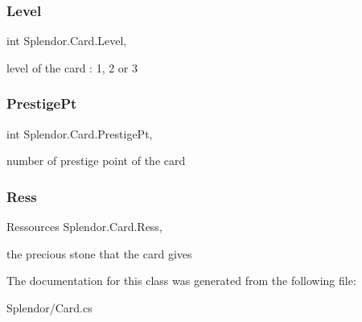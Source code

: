 \mbox{\label{class_splendor_1_1_card_aadc9953aeb322c82e04fbd9b5a3b996d}} 
\subsubsection{\texorpdfstring{Level}{Level}}
{\footnotesize\ttfamily int Splendor.\+Card.\+Level\hspace{0.3cm}{\ttfamily [get]}, {\ttfamily [set]}}



level of the card \+: 1, 2 or 3 

\mbox{\label{class_splendor_1_1_card_a117119ceac083b7b7d39f11e5bbd7225}} 
\subsubsection{\texorpdfstring{Prestige\+Pt}{PrestigePt}}
{\footnotesize\ttfamily int Splendor.\+Card.\+Prestige\+Pt\hspace{0.3cm}{\ttfamily [get]}, {\ttfamily [set]}}



number of prestige point of the card 

\mbox{\label{class_splendor_1_1_card_afcfaa7ea5072b3cd30c04adddc8dd5c7}} 
\subsubsection{\texorpdfstring{Ress}{Ress}}
{\footnotesize\ttfamily Ressources Splendor.\+Card.\+Ress\hspace{0.3cm}{\ttfamily [get]}, {\ttfamily [set]}}



the precious stone that the card gives 



The documentation for this class was generated from the following file\+:\begin{DoxyCompactItemize}
\item 
Splendor/Card.\+cs\end{DoxyCompactItemize}
